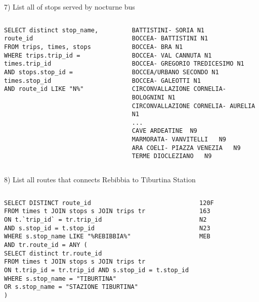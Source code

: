 \documentclass{beamer}
\begin{document}
\begin{frame}[fragile]
 7) List all of stops served by nocturne bus
 \begin{columns}
   \begin{lstlisting}
SELECT distinct stop_name, route_id 
FROM trips, times, stops 
WHERE trips.trip_id = times.trip_id 
AND stops.stop_id = times.stop_id 
AND route_id LIKE "N%"
\end{lstlisting}
\small
\begin{verbatim}
BATTISTINI- SORIA N1
BOCCEA- BATTISTINI N1
BOCCEA- BRA N1
BOCCEA- VAL CANNUTA N1
BOCCEA- GREGORIO TREDICESIMO N1
BOCCEA/URBANO SECONDO N1
BOCCEA- GALEOTTI N1
CIRCONVALLAZIONE CORNELIA- BOLOGNINI N1
CIRCONVALLAZIONE CORNELIA- AURELIA N1
...
CAVE ARDEATINE 	N9
MARMORATA- VANVITELLI	N9
ARA COELI- PIAZZA VENEZIA	N9
TERME DIOCLEZIANO	N9
\end{verbatim}
 \end{columns}
\end{frame}

\begin{frame}[fragile]
 8) List all routes that connects Rebibbia to Tiburtina Station
 \begin{columns}
   \begin{lstlisting}
SELECT DISTINCT route_id
FROM times t JOIN stops s JOIN trips tr 
ON t.`trip_id` = tr.trip_id 
AND s.stop_id = t.stop_id
WHERE s.stop_name LIKE "%REBIBBIA%"
AND tr.route_id = ANY (
SELECT distinct tr.route_id 
FROM times t JOIN stops s JOIN trips tr 
ON t.trip_id = tr.trip_id AND s.stop_id = t.stop_id
WHERE s.stop_name = "TIBURTINA" 
OR s.stop_name = "STAZIONE TIBURTINA"
)
\end{lstlisting}
\small
\begin{verbatim}
120F
163
N2
N23
MEB
\end{verbatim}
 \end{columns}
\end{frame}
\end{document}
